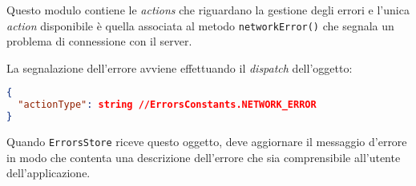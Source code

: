 Questo modulo contiene le \textit{actions} che riguardano la gestione degli errori e l'unica \textit{action} disponibile è quella associata al metodo \texttt{networkError()} che segnala un problema di connessione con il server.

La segnalazione dell'errore avviene effettuando il \textit{dispatch} dell'oggetto:
\begin{lstlisting}[language=JSON, caption=Action - network error]
{
  "actionType": string //ErrorsConstants.NETWORK_ERROR
}
\end{lstlisting}

Quando \texttt{ErrorsStore} riceve questo oggetto, deve aggiornare il messaggio d'errore in modo che contenta una descrizione dell'errore che sia comprensibile all'utente dell'applicazione.
